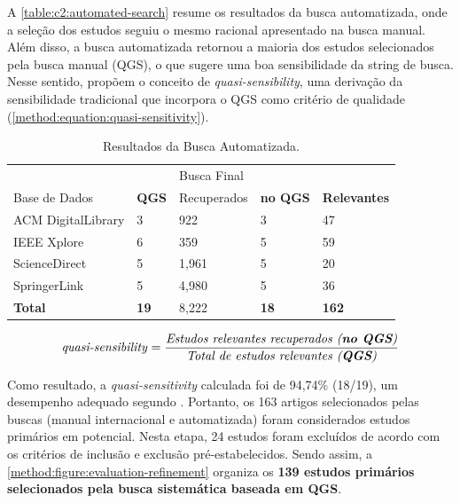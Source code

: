 A \autoref{table:c2:automated-search} resume os resultados da busca automatizada, onde a seleção dos estudos seguiu o mesmo racional apresentado na busca manual. Além disso, a busca automatizada retornou a maioria dos estudos selecionados pela busca manual (QGS), o que sugere uma boa sensibilidade da string de busca. Nesse sentido,  propõem o conceito de \textit{quasi-sensibility}, uma derivação da sensibilidade tradicional que incorpora o QGS como critério de qualidade (\autoref{method:equation:quasi-sensitivity}).

\begin{table}[htb]
\centering
\caption{Resultados da Busca Automatizada.}
\label{table:c2:automated-search}
\begin{tabular}{ll|lll} \hline
 &  & Busca Final &                 &                   \\ \cline{3-5} 
Base de Dados & \textbf{QGS} & Recuperados    & \textbf{no QGS} & \textbf{Relevantes} \\ \hline
ACM DigitalLibrary & 3            & 922          & 3               & 47                \\
IEEE Xplore        & 6            & 359          & 5               & 59                \\
ScienceDirect      & 5            & 1,961        & 5               & 20                \\
SpringerLink       & 5            & 4,980        & 5               & 36                \\ \hline
\multicolumn{1}{l}{\textbf{Total}}   & \textbf{19}  & 8,222        & \textbf{18}     & \textbf{162}      \\ \hline
\end{tabular}
\end{table}

\begin{equation}
\label{method:equation:quasi-sensitivity}
\text{\textit{quasi-sensibility}} = \frac{\text{\textit{Estudos relevantes recuperados (\textbf{no QGS})}}}{\text{\textit{Total de estudos relevantes (\textbf{QGS})}}}
\end{equation}

Como resultado, a \textit{quasi-sensitivity} calculada foi de 94,74\% (18/19), um desempenho adequado segundo . Portanto, os 163 artigos selecionados pelas buscas (manual internacional e automatizada) foram considerados estudos primários em potencial. Nesta etapa, 24 estudos foram excluídos de acordo com os critérios de inclusão e exclusão pré-estabelecidos. Sendo assim, a \autoref{method:figure:evaluation-refinement} organiza os \textbf{139 estudos primários selecionados pela busca sistemática baseada em QGS}.

